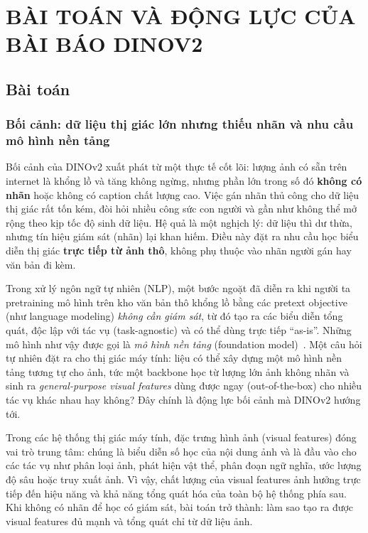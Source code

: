 \chapter{BÀI TOÁN VÀ ĐỘNG LỰC CỦA BÀI BÁO DINOV2}

\section{Bài toán}
\subsection{Bối cảnh: dữ liệu thị giác lớn nhưng thiếu nhãn và nhu cầu mô hình nền tảng}
Bối cảnh của DINOv2 xuất phát từ một thực tế cốt lõi: lượng ảnh có sẵn trên internet là khổng lồ và tăng không ngừng, nhưng phần lớn trong số đó \textbf{không có nhãn} hoặc không có caption chất lượng cao. Việc gán nhãn thủ công cho dữ liệu thị giác rất tốn kém, đòi hỏi nhiều công sức con người và gần như không thể mở rộng theo kịp tốc độ sinh dữ liệu. Hệ quả là một nghịch lý: dữ liệu thì dư thừa, nhưng tín hiệu giám sát (nhãn) lại khan hiếm. Điều này đặt ra nhu cầu học biểu diễn thị giác \textbf{trực tiếp từ ảnh thô}, không phụ thuộc vào nhãn người gán hay văn bản đi kèm.

Trong xử lý ngôn ngữ tự nhiên (NLP), một bước ngoặt đã diễn ra khi người ta pretraining mô hình trên kho văn bản thô khổng lồ bằng các pretext objective (như language modeling) \emph{không cần giám sát}, từ đó tạo ra các biểu diễn tổng quát, độc lập với tác vụ (task-agnostic) và có thể dùng trực tiếp ``as-is''. Những mô hình như vậy được gọi là \emph{mô hình nền tảng} (foundation model)~\cite{foundation}. Một câu hỏi tự nhiên đặt ra cho thị giác máy tính: liệu có thể xây dựng một mô hình nền tảng tương tự cho ảnh, tức một backbone học từ lượng lớn ảnh không nhãn và sinh ra \emph{general-purpose visual features} dùng được ngay (out-of-the-box) cho nhiều tác vụ khác nhau hay không? Đây chính là động lực bối cảnh mà DINOv2 hướng tới.

Trong các hệ thống thị giác máy tính, đặc trưng hình ảnh (visual features) đóng vai trò trung tâm: chúng là biểu diễn số học của nội dung ảnh và là đầu vào cho các tác vụ như phân loại ảnh, phát hiện vật thể, phân đoạn ngữ nghĩa, ước lượng độ sâu hoặc truy xuất ảnh. Vì vậy, chất lượng của visual features ảnh hưởng trực tiếp đến hiệu năng và khả năng tổng quát hóa của toàn bộ hệ thống phía sau. Khi không có nhãn để học có giám sát, bài toán trở thành: làm sao tạo ra được visual features đủ mạnh và tổng quát chỉ từ dữ liệu ảnh.

